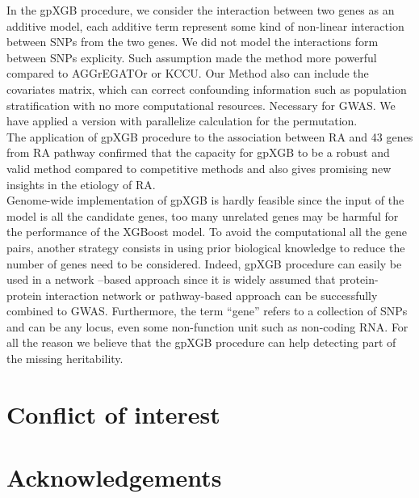 \documentclass[11pt]{article}
\theoremstyle{plain}
\theoremstyle{definition}
\theoremstyle{remark}
\begin{document}
In the gpXGB procedure, we consider the interaction between two genes as an additive model, each additive term represent some kind of non-linear interaction between SNPs from the two genes. We did not model the interactions form between SNPs explicity. Such assumption made the method more powerful compared to AGGrEGATOr or KCCU. Our Method also can include the covariates matrix, which can correct confounding information such as population stratification with no more computational resources. Necessary for GWAS. We have applied a version with parallelize calculation for the permutation.\\

The application of gpXGB procedure to the association between RA and 43 genes from RA pathway confirmed that the capacity for gpXGB to be a robust and valid method compared to competitive methods and also gives promising new insights in the etiology of RA.\\

Genome-wide implementation of gpXGB is hardly feasible since the input of the model is all the candidate genes, too many unrelated genes may be harmful for the performance of the XGBoost model. To avoid the computational all the gene pairs, another strategy consists in using prior biological knowledge to reduce the number of genes need to be considered. Indeed, gpXGB procedure can easily be used in a network –based approach since it is widely assumed that protein-protein interaction network or pathway-based approach can be successfully combined to GWAS. Furthermore, the term “gene” refers to a collection of SNPs and can be any locus, even some non-function unit such as non-coding RNA. For all the reason we believe that the gpXGB procedure can help detecting part of the missing heritability.


\section{Conflict of interest}

\section{Acknowledgements}
\end{document}
